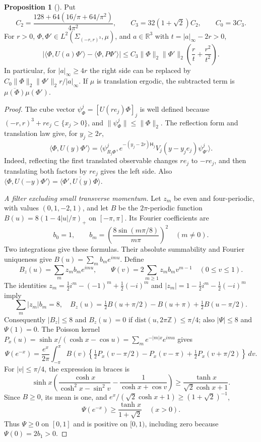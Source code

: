 \documentclass[11pt,letterpaper,reqno]{amsart}
\theoremstyle{definition}
\newtheorem{qcmproposition}{Proposition}[section]
\newenvironment{proposition}[1][]{\pushQED{\qed}\renewcommand{\qedsymbol}{$\blacksquare$}\begin{qcmproposition}[#1]}{\popQED\end{qcmproposition}}
\begin{document}
\begin{proposition}\label{qcm:continuum-clustering}
Put
\[
 C_2=\frac{128+64(16/\pi+64/\pi^2)}{4\pi^2},\qquad
 C_3=32(1+\sqrt2)C_2,\qquad C_0=3C_3.
\]
For $r>0$, $\Phi,\Phi'\in L^2(\Sigma_{(-r,r)^3},\mu)$, and
$a\in\mathbb R^3$ with $t=|a|_\infty-2r>0$,
\[
 \left|\langle\Phi,U(a)\Phi'\rangle-\langle\Phi,P\Phi'\rangle\right|
 \le C_3\|\Phi\|_2\|\Phi'\|_2
       \left(\frac rt+\frac{r^2}{t^2}\right).
\]
In particular, for $|a|_\infty\ge4r$ the right side can be replaced by
$C_0\|\Phi\|_2\|\Phi'\|_2r/|a|_\infty$.
If $\mu$ is translation ergodic, the subtracted term is
$\overline{\mu(\Phi)}\mu(\Phi')$.
\end{proposition}

\begin{proof}
The cube vector $\psi^j_\Phi=[U(re_j)\Phi]_j$ is well defined because
$(-r,r)^3+re_j\subset\{x_j>0\}$, and
$\|\psi^j_\Phi\|\le\|\Phi\|_2$. The reflection form and translation
law give, for $y_j\ge2r$,
\begin{equation}\label{eq:qcm-two-cubes}
 \langle\Phi,U(y)\Phi'\rangle
 =\langle\psi^j_{R_j\Phi},e^{-(y_j-2r)\mathsf H_j}
                  V_j(y- y_je_j)\psi^j_{\Phi'}\rangle.
\end{equation}
Indeed, reflecting the first translated observable changes $re_j$ to
$-re_j$, and then translating both factors by $re_j$ gives the left
side. Also
$\langle\Phi,U(-y)\Phi'\rangle=
\overline{\langle\Phi',U(y)\Phi\rangle}$.

\emph{A filter excluding small transverse momentum.}
Let $z_m$ be even and four-periodic, with values $(0,1,-2,1)$,
and let $B$ be the $2\pi$-periodic function
$B(u)=8(1-4|u|/\pi)_+$ on $[-\pi,\pi]$. Its Fourier coefficients are
\[
 b_0=1,\qquad b_m=\left(\frac{8\sin(m\pi/8)}{m\pi}\right)^2
 \quad(m\ne0).
\]
Two integrations give these formulas. Their absolute summability and
Fourier uniqueness give $B(u)=\sum_m b_me^{imu}$. Define
\[
 B_z(u)=\sum_mz_mb_me^{imu},\qquad
 \Psi(v)=2\sum_{m\ge1}z_mb_mv^{m-1}\quad(0\le v\le1).
\]
The identities
$z_m=\tfrac12i^m-(-1)^m+\tfrac12(-i)^m$ and
$|z_m|=1-\tfrac12i^m-\tfrac12(-i)^m$ imply
\[
 \sum_m|z_m|b_m=8,\quad
 B_z(u)=\tfrac12B(u+\pi/2)-B(u+\pi)+\tfrac12B(u-\pi/2).
\]
Consequently $|B_z|\le8$ and $B_z(u)=0$ if
$\mathrm{dist}(u,2\pi\mathbb Z)\le\pi/4$; also $|\Psi|\le8$ and
$\Psi(1)=0$.
The Poisson kernel
$P_x(u)=\sinh x/(\cosh x-\cos u)=\sum_m e^{-|m|x}e^{imu}$ gives
\[
 \Psi(e^{-x})=\frac{e^x}{2\pi}\int_{-\pi}^{\pi}B(v)
 \left\{\tfrac12P_x(v-\pi/2)-P_x(v-\pi)
                        +\tfrac12P_x(v+\pi/2)\right\}\,dv.
\]
For $|v|\le\pi/4$, the expression in braces is
\[
 \sinh x\left(\frac{\cosh x}{\cosh^2x-\sin^2v}
                     -\frac1{\cosh x+\cos v}\right)
 \ge\frac{\tanh x}{\sqrt2\cosh x+1}.
\]
Since $B\ge0$, its mean is one, and
$e^x/(\sqrt2\cosh x+1)\ge(1+\sqrt2)^{-1}$,
\begin{equation}\label{eq:qcm-filter-lower}
 \Psi(e^{-x})\ge\frac{\tanh x}{1+\sqrt2}\quad(x>0).
\end{equation}
Thus $\Psi\ge0$ on $[0,1]$ and is positive on $[0,1)$,
including zero because $\Psi(0)=2b_1>0$.


\end{proof}
\end{document}
